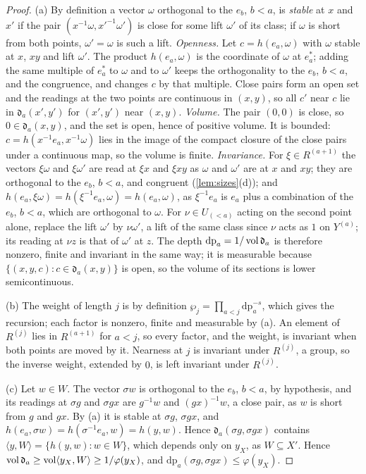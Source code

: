 \begin{proof}
(a) By definition a vector $\omega$ orthogonal to the $e_b$, $b<a$, is \emph{stable} at $x$ and $x'$ if the pair $(x^{-1}\omega,x'^{-1}\omega')$ is close for some lift $\omega'$ of its class; if $\omega$ is short from both points, $\omega'=\omega$ is such a lift. \emph{Openness.} Let $c=h(e_a,\omega)$
with $\omega$ stable at $x$, $xy$ and lift $\omega'$. The product $h(e_a,\omega)$ is the coordinate of $\omega$ at $e^*_a$; adding the same multiple of $e^*_a$ to $\omega$ and to $\omega'$ keeps the orthogonality to the $e_b$, $b<a$, and the congruence, and changes $c$
by that multiple. Close pairs form an open set and the readings at the two points are continuous in $(x,y)$, so all $c'$ near $c$ lie in $\mathfrak d_a(x',y')$ for $(x',y')$ near $(x,y)$. \emph{Volume.} The pair $(0,0)$ is close, so $0\in\mathfrak d_a(x,y)$, and the set is open,
hence of positive volume. It is bounded: $c=h(x^{-1}e_a,x^{-1}\omega)$ lies in the image of the compact closure of the close pairs under a continuous map, so the volume is finite. \emph{Invariance.} For $\xi\in R^{(a+1)}$ the vectors $\xi\omega$ and $\xi\omega'$ are read
at $\xi x$ and $\xi xy$ as $\omega$ and $\omega'$ are at $x$ and $xy$; they are orthogonal to the $e_b$, $b<a$, and congruent (\cref{lem:sizes}(d)); and $h(e_a,\xi\omega)=h(\xi^{-1}e_a,\omega)=h(e_a,\omega)$, as $\xi^{-1}e_a$ is $e_a$ plus a combination of the $e_b$, $b<a$,
which are orthogonal to $\omega$. For $\nu\in U_{(<a)}$ acting on the second point alone, replace the lift $\omega'$ by $\nu\omega'$, a lift of the same class since $\nu$ acts as $1$ on $Y^{(a)}$; its reading at $\nu z$ is that of $\omega'$ at $z$. The depth
$\mathrm{dp}_a=1/\operatorname{vol}\mathfrak d_a$ is therefore nonzero, finite and invariant in the same way; it is measurable because $\{(x,y,c):c\in\mathfrak d_a(x,y)\}$ is open, so the volume of its sections is lower semicontinuous.

(b) The weight of length $j$ is by definition $\wp_j=\prod_{a<j}\mathrm{dp}_a^{-s}$, which gives the recursion; each factor is nonzero, finite and measurable by (a). An element of $R^{(j)}$ lies in $R^{(a+1)}$ for $a<j$, so every factor, and the weight, is invariant
when both points are moved by it. Nearness at $j$ is invariant under $R^{(j)}$, a group, so the inverse weight, extended by $0$, is left invariant under $R^{(j)}$.

(c) Let $w\in W$. The vector $\sigma w$ is orthogonal to the $e_b$, $b<a$, by hypothesis, and its readings at $\sigma g$ and $\sigma gx$ are $g^{-1}w$ and $(gx)^{-1}w$, a close pair, as $w$ is short from $g$ and $gx$. By (a) it is stable at $\sigma g$, $\sigma gx$, and
$h(e_a,\sigma w)=h(\sigma^{-1}e_a,w)=h(y,w)$. Hence $\mathfrak d_a(\sigma g,\sigma gx)$ contains $\langle y,W\rangle=\{h(y,w):w\in W\}$, which depends only on $y_X$, as $W\subseteq X'$. Hence $\operatorname{vol}\mathfrak d_a\ge\operatorname{vol}\langle y_X,W\rangle\ge1/\varphi(y_X)$, and
$\mathrm{dp}_a(\sigma g,\sigma gx)\le\varphi(y_X)$.
\end{proof}

